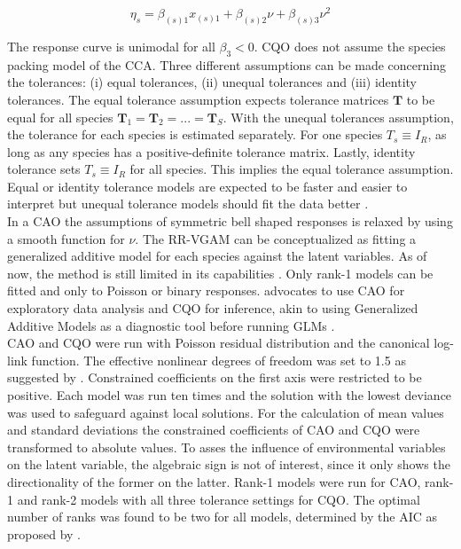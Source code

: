 		\begin{equation}\label{eq:CQO1} 
		\eta_s = \beta_{(s)1} x_{(s)1} + \beta_{(s)2} \nu + \beta_{(s)3} \nu^2	
		\end{equation} 
		
		The response curve is unimodal for all $\beta_3 < 0$.
		CQO does not assume the species packing model of the CCA.
		Three different assumptions can be made concerning the tolerances: (i) equal tolerances, (ii) unequal tolerances and (iii) identity tolerances.
		The equal tolerance assumption expects tolerance matrices $\mathbf{T}$ to be equal for all species $\mathbf{T}_1 = \mathbf{T}_2 = ... = \mathbf{T}_S$.
		With the unequal tolerances assumption, the tolerance for each species is estimated separately.
		For one species $T_s \equiv I_R$, as long as any species has a positive-definite tolerance matrix. 
		Lastly, identity tolerance sets $T_s \equiv I_R$ for all species. 
		This implies the equal tolerance assumption.  
		Equal or identity tolerance models are expected to be faster and easier to interpret but unequal tolerance models should fit the data better \citep{yee2015vector}.\\
		In a CAO the assumptions of symmetric bell shaped responses is relaxed by using a smooth function for $\nu$. 
		The RR-VGAM can be conceptualized as fitting a generalized additive model for each species against the latent variables.
		As of now, the method is still limited in its capabilities \citep{Yee2006}.
		Only rank-1 models can be fitted and only to Poisson or binary responses.  
		\citet{Yee2006} advocates to use CAO for exploratory data analysis and CQO for inference, akin to using Generalized Additive Models as a diagnostic tool before running GLMs \citep{Hastie2008}.\\
		  
		 
		CAO and CQO were run with Poisson residual distribution and the canonical log-link function.
		The effective nonlinear degrees  of freedom was set to 1.5 as suggested by \citet{yee2015vector}.
		Constrained coefficients on the first axis were restricted to be positive. 
		Each model was run ten times and the solution with the lowest deviance was used to safeguard against local solutions.
		For the calculation of mean values and standard deviations the constrained coefficients of CAO and CQO were transformed to absolute values. 
		To asses the influence of environmental variables on the latent variable, the algebraic sign is not of interest, since it only shows the directionality of the former on the latter.
		Rank-1 models were run for CAO, rank-1 and rank-2 models with all three tolerance settings for CQO. 
		The optimal number of ranks was found to be two for all models, determined by the AIC as proposed by \citet{yee2003reduced}. \\
		
